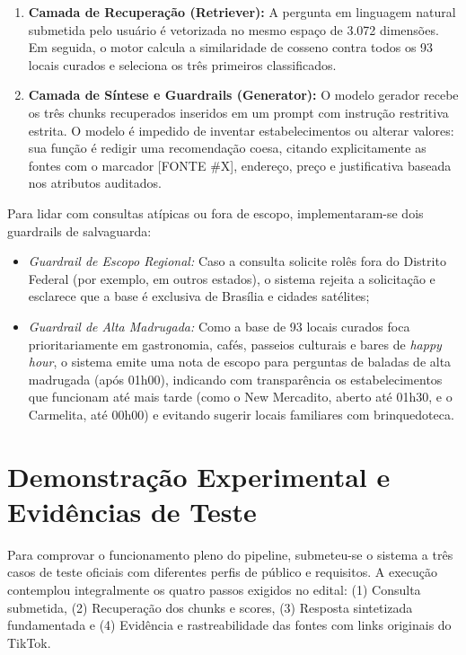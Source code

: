 \documentclass[11pt,a4paper]{article}
\begin{document}
\begin{enumerate}
\item \textbf{Camada de Recuperação (Retriever):} A pergunta em linguagem natural submetida pelo usuário é vetorizada no mesmo espaço de 3.072 dimensões. Em seguida, o motor calcula a similaridade de cosseno contra todos os 93 locais curados e seleciona os três primeiros classificados.
\item \textbf{Camada de Síntese e Guardrails (Generator):} O modelo gerador recebe os três chunks recuperados inseridos em um prompt com instrução restritiva estrita. O modelo é impedido de inventar estabelecimentos ou alterar valores: sua função é redigir uma recomendação coesa, citando explicitamente as fontes com o marcador [FONTE \#X], endereço, preço e justificativa baseada nos atributos auditados.
\end{enumerate}

Para lidar com consultas atípicas ou fora de escopo, implementaram-se dois guardrails de salvaguarda:
\begin{itemize}
\item \textit{Guardrail de Escopo Regional:} Caso a consulta solicite rolês fora do Distrito Federal (por exemplo, em outros estados), o sistema rejeita a solicitação e esclarece que a base é exclusiva de Brasília e cidades satélites;
\item \textit{Guardrail de Alta Madrugada:} Como a base de 93 locais curados foca prioritariamente em gastronomia, cafés, passeios culturais e bares de \textit{happy hour}, o sistema emite uma nota de escopo para perguntas de baladas de alta madrugada (após 01h00), indicando com transparência os estabelecimentos que funcionam até mais tarde (como o New Mercadito, aberto até 01h30, e o Carmelita, até 00h00) e evitando sugerir locais familiares com brinquedoteca.
\end{itemize}

\section{Demonstração Experimental e Evidências de Teste}

Para comprovar o funcionamento pleno do pipeline, submeteu-se o sistema a três casos de teste oficiais com diferentes perfis de público e requisitos. A execução contemplou integralmente os quatro passos exigidos no edital: (1) Consulta submetida, (2) Recuperação dos chunks e scores, (3) Resposta sintetizada fundamentada e (4) Evidência e rastreabilidade das fontes com links originais do TikTok.
\end{document}
